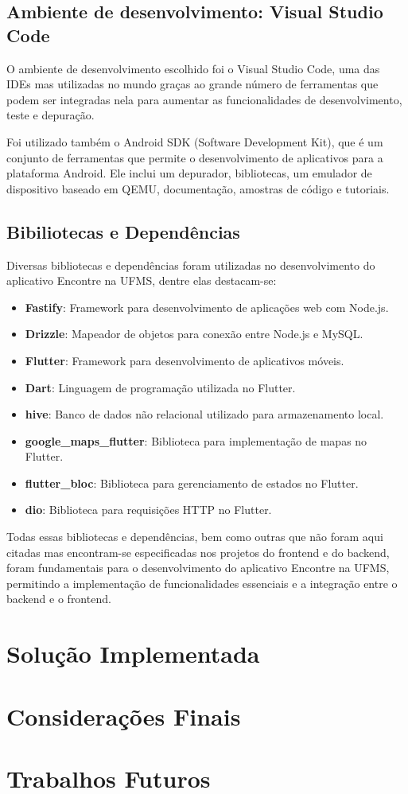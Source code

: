 \documentclass[12pt]{article}
\begin{document}
\subsection{Ambiente de desenvolvimento: Visual Studio Code}
O ambiente de desenvolvimento escolhido foi o Visual Studio Code, uma das IDEs mas utilizadas no mundo graças ao grande número de ferramentas que podem ser integradas nela para aumentar as funcionalidades de desenvolvimento, teste e depuração.

Foi utilizado também o Android SDK (Software Development Kit), que é um conjunto de ferramentas que permite o desenvolvimento de aplicativos para a plataforma Android. Ele inclui um depurador, bibliotecas, um emulador de dispositivo baseado em QEMU, documentação, amostras de código e tutoriais.

\subsection{Bibiliotecas e Dependências}
Diversas bibliotecas e dependências foram utilizadas no desenvolvimento do aplicativo Encontre na UFMS, dentre elas destacam-se:

\begin{itemize}
  \item \textbf{Fastify}: Framework para desenvolvimento de aplicações web com Node.js.
  \item \textbf{Drizzle}: Mapeador de objetos para conexão entre Node.js e MySQL.
  \item \textbf{Flutter}: Framework para desenvolvimento de aplicativos móveis.
  \item \textbf{Dart}: Linguagem de programação utilizada no Flutter.
  \item \textbf{hive}: Banco de dados não relacional utilizado para armazenamento local.
  \item \textbf{google\_maps\_flutter}: Biblioteca para implementação de mapas no Flutter.
  \item \textbf{flutter\_bloc}: Biblioteca para gerenciamento de estados no Flutter.
  \item \textbf{dio}: Biblioteca para requisições HTTP no Flutter.
\end{itemize}

Todas essas bibliotecas e dependências, bem como outras que não foram aqui citadas mas encontram-se especificadas nos projetos do frontend e do backend, foram fundamentais para o desenvolvimento do aplicativo Encontre na UFMS, permitindo a implementação de funcionalidades essenciais e a integração entre o backend e o frontend.

\section{Solução Implementada}
\section{Considerações Finais}
\section{Trabalhos Futuros}
\end{document}
